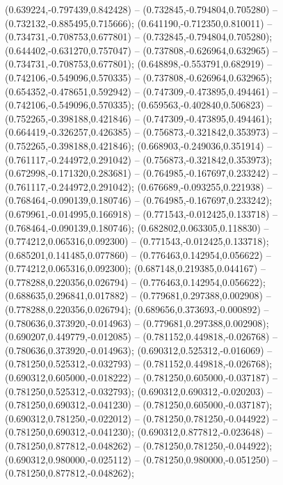  (0.639224,-0.797439,0.842428) -- (0.732845,-0.794804,0.705280) -- (0.732132,-0.885495,0.715666);
 (0.641190,-0.712350,0.810011) -- (0.734731,-0.708753,0.677801) -- (0.732845,-0.794804,0.705280);
 (0.644402,-0.631270,0.757047) -- (0.737808,-0.626964,0.632965) -- (0.734731,-0.708753,0.677801);
 (0.648898,-0.553791,0.682919) -- (0.742106,-0.549096,0.570335) -- (0.737808,-0.626964,0.632965);
 (0.654352,-0.478651,0.592942) -- (0.747309,-0.473895,0.494461) -- (0.742106,-0.549096,0.570335);
 (0.659563,-0.402840,0.506823) -- (0.752265,-0.398188,0.421846) -- (0.747309,-0.473895,0.494461);
 (0.664419,-0.326257,0.426385) -- (0.756873,-0.321842,0.353973) -- (0.752265,-0.398188,0.421846);
 (0.668903,-0.249036,0.351914) -- (0.761117,-0.244972,0.291042) -- (0.756873,-0.321842,0.353973);
 (0.672998,-0.171320,0.283681) -- (0.764985,-0.167697,0.233242) -- (0.761117,-0.244972,0.291042);
 (0.676689,-0.093255,0.221938) -- (0.768464,-0.090139,0.180746) -- (0.764985,-0.167697,0.233242);
 (0.679961,-0.014995,0.166918) -- (0.771543,-0.012425,0.133718) -- (0.768464,-0.090139,0.180746);
 (0.682802,0.063305,0.118830) -- (0.774212,0.065316,0.092300) -- (0.771543,-0.012425,0.133718);
 (0.685201,0.141485,0.077860) -- (0.776463,0.142954,0.056622) -- (0.774212,0.065316,0.092300);
 (0.687148,0.219385,0.044167) -- (0.778288,0.220356,0.026794) -- (0.776463,0.142954,0.056622);
 (0.688635,0.296841,0.017882) -- (0.779681,0.297388,0.002908) -- (0.778288,0.220356,0.026794);
 (0.689656,0.373693,-0.000892) -- (0.780636,0.373920,-0.014963) -- (0.779681,0.297388,0.002908);
 (0.690207,0.449779,-0.012085) -- (0.781152,0.449818,-0.026768) -- (0.780636,0.373920,-0.014963);
 (0.690312,0.525312,-0.016069) -- (0.781250,0.525312,-0.032793) -- (0.781152,0.449818,-0.026768);
 (0.690312,0.605000,-0.018222) -- (0.781250,0.605000,-0.037187) -- (0.781250,0.525312,-0.032793);
 (0.690312,0.690312,-0.020203) -- (0.781250,0.690312,-0.041230) -- (0.781250,0.605000,-0.037187);
 (0.690312,0.781250,-0.022012) -- (0.781250,0.781250,-0.044922) -- (0.781250,0.690312,-0.041230);
 (0.690312,0.877812,-0.023648) -- (0.781250,0.877812,-0.048262) -- (0.781250,0.781250,-0.044922);
 (0.690312,0.980000,-0.025112) -- (0.781250,0.980000,-0.051250) -- (0.781250,0.877812,-0.048262);
